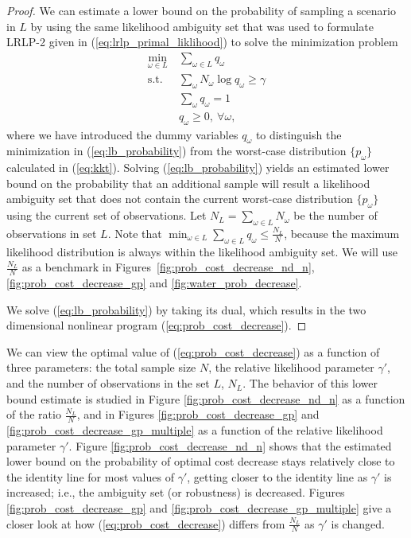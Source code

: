 \documentclass[11pt]{article}
\begin{document}
\begin{proof}
	We can estimate a lower bound on the probability of sampling a scenario in $L$ by using the same likelihood ambiguity set that was used to formulate LRLP-2 given in (\ref{eq:lrlp_primal_liklihood}) to solve the minimization problem
	\begin{align}
		\min_{\omega \in L} \ & \sum_{\omega \in L} q_\omega \nonumber \\
		\mbox{s.t.} & \sum_\omega N_\omega \log q_\omega \geq \gamma \label{eq:lb_probability} \\
		& \sum_\omega q_\omega = 1 \nonumber \\
		& q_\omega \geq 0, \ \forall \omega, \nonumber
	\end{align}
	where we have introduced the dummy variables $q_\omega$ to distinguish the minimization in (\ref{eq:lb_probability}) from the worst-case distribution $\{p_\omega\}$ calculated in (\ref{eq:kkt}). 
	Solving (\ref{eq:lb_probability}) yields an estimated lower bound on the probability that an additional sample will result a likelihood ambiguity set that does not contain the current worst-case distribution $\{p_\omega\}$ using the current set of observations. 
	Let $N_L = \sum_{\omega \in L} N_\omega$ be the number of observations in set $L$. Note that $\min_{\omega \in L} \sum_{\omega \in L} q_\omega \leq \frac{N_L}{N}$, because the maximum likelihood distribution is always within the likelihood ambiguity set. We will use $\frac{N_L}{N}$ as a benchmark in Figures~\ref{fig:prob_cost_decrease_nd_n}, \ref{fig:prob_cost_decrease_gp} and \ref{fig:water_prob_decrease}. 

	We solve (\ref{eq:lb_probability}) by taking its dual, which results in the two dimensional nonlinear program (\ref{eq:prob_cost_decrease}).
\end{proof}

We can view the optimal value of (\ref{eq:prob_cost_decrease}) as a function of three parameters: the total sample size $N$, the relative likelihood parameter $\gamma'$, and the number of observations in the set $L$, $N_L$.
The behavior of this lower bound estimate is studied in Figure \ref{fig:prob_cost_decrease_nd_n} as a function of the ratio $\tfrac{N_L}{N}$, and in Figures \ref{fig:prob_cost_decrease_gp} and \ref{fig:prob_cost_decrease_gp_multiple} as a function of the relative likelihood parameter $\gamma'$.
Figure \ref{fig:prob_cost_decrease_nd_n} shows that the estimated lower bound on the probability of optimal cost decrease stays relatively close to the identity line for most values of $\gamma'$, getting closer to the identity line as  $\gamma'$ is increased; i.e., the ambiguity set (or robustness) is decreased.
Figures \ref{fig:prob_cost_decrease_gp} and \ref{fig:prob_cost_decrease_gp_multiple} give a closer look at how (\ref{eq:prob_cost_decrease}) differs from $\tfrac{N_L}{N}$ as $\gamma'$ is changed.
\end{document}
